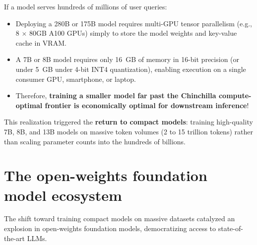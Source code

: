 \documentclass[../../main.tex]{subfiles}
\begin{document}
If a model serves hundreds of millions of user queries:
\begin{itemize}
    \item Deploying a 280B or 175B model requires multi-GPU tensor parallelism (e.g., 8 $\times$ 80GB A100 GPUs) simply to store the model weights and key-value cache in VRAM.
    \item A 7B or 8B model requires only 16~GB of memory in 16-bit precision (or under 5~GB under 4-bit INT4 quantization), enabling execution on a single consumer GPU, smartphone, or laptop.
    \item Therefore, \textbf{training a smaller model far past the Chinchilla compute-optimal frontier is economically optimal for downstream inference}!
\end{itemize}

This realization triggered the \textbf{return to compact models}: training high-quality 7B, 8B, and 13B models on massive token volumes (2 to 15 trillion tokens) rather than scaling parameter counts into the hundreds of billions.

\section{The open-weights foundation model ecosystem}
\label{sec:open_weights_ecosystem}

The shift toward training compact models on massive datasets catalyzed an explosion in open-weights foundation models, democratizing access to state-of-the-art LLMs.
\end{document}
